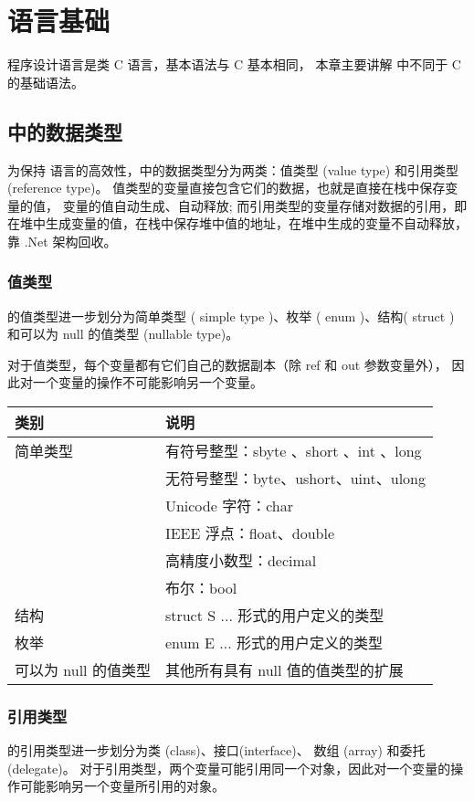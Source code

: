 
\chapter{ \cs 语言基础}

\cs 程序设计语言是类 C 语言，基本语法与 C 基本相同， 本章主要讲解 \cs 中不同于 C 的基础语法。

\section{ \cs 中的数据类型}
 为保持 \cs 语言的高效性，\cs 中的数据类型分为两类：值类型 (value type) 和引用类型 (reference type)。
值类型的变量直接包含它们的数据，也就是直接在栈中保存变量的值， 变量的值自动生成、自动释放;
而引用类型的变量存储对数据的引用，即在堆中生成变量的值，在栈中保存堆中值的地址，在堆中生成的变量不自动释放，靠 .Net 架构回收。

\subsection{值类型}
 \cs  的值类型进一步划分为简单类型 ( simple type )、枚举 ( enum )、结构( struct )
和可以为 null 的值类型 (nullable type)。

对于值类型，每个变量都有它们自己的数据副本（除 ref 和 out 参数变量外），
因此对一个变量的操作不可能影响另一个变量。

\begin{tabular}{|l|l|}
\hline
类别   & 说明 \\
\hline
简单类型   & 有符号整型：sbyte 、short 、int 、long \\
          & 无符号整型：byte、ushort、uint、ulong \\
          & Unicode 字符：char \\
          & IEEE 浮点：float、double \\
          & 高精度小数型：decimal \\
          & 布尔：bool \\
\hline
结构                & struct S {...} 形式的用户定义的类型 \\
枚举                & enum E {...} 形式的用户定义的类型   \\
可以为 null 的值类型 & 其他所有具有 null 值的值类型的扩展   \\
\hline
\end{tabular}


\subsection{引用类型}
 \cs  的引用类型进一步划分为类 (class)、接口(interface)、
数组 (array) 和委托(delegate)。
对于引用类型，两个变量可能引用同一个对象，因此对一个变量的操作可能影响另一个变量所引用的对象。

